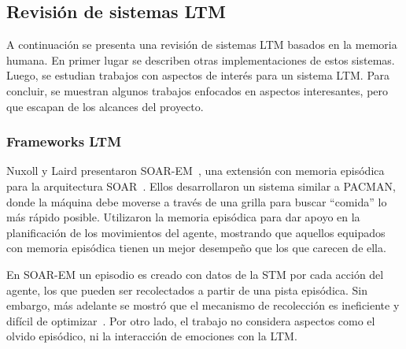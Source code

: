 \subsection{Revisión de sistemas LTM}\label{sec:revision_LTM}

A continuación se presenta una revisión de sistemas LTM basados en la memoria humana. En primer lugar se describen otras implementaciones de estos sistemas. Luego, se estudian trabajos con aspectos de interés para un sistema LTM. Para concluir, se muestran algunos trabajos enfocados en aspectos interesantes, pero que escapan de los alcances del proyecto.

\subsubsection{Frameworks LTM}

Nuxoll y Laird presentaron SOAR-EM~\cite{Nuxoll2004ACM}, una extensión con memoria episódica para la arquitectura SOAR~\cite{LAIRD19871}. Ellos desarrollaron un sistema similar a PACMAN, donde la máquina debe moverse a través de una grilla para buscar ``comida'' lo más rápido posible. Utilizaron la memoria episódica para dar apoyo en la planificación de los movimientos del agente, mostrando que aquellos equipados con memoria episódica tienen un mejor desempeño que los que carecen de ella. 

En SOAR-EM un episodio es creado con datos de la STM por cada acción del agente, los que pueden ser recolectados a partir de una pista episódica. Sin embargo, más adelante se mostró que el mecanismo de recolección es ineficiente y difícil de optimizar~\cite{Nuxoll2007}. Por otro lado, el trabajo no considera aspectos como el olvido episódico, ni la interacción de emociones con la LTM.


